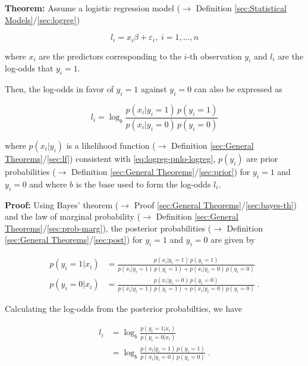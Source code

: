 \documentclass[a4paper,12pt,twoside]{book}
\begin{document}
\textbf{Theorem:} Assume a logistic regression model ($\rightarrow$ Definition \ref{sec:Statistical Models}/\ref{sec:logreg})

\begin{equation} \label{eq:logreg-pnlo-logreg}
l_i = x_i \beta + \varepsilon_i, \; i = 1,\ldots,n
\end{equation}

where $x_i$ are the predictors corresponding to the $i$-th observation $y_i$ and $l_i$ are the log-odds that $y_i = 1$.

Then, the log-odds in favor of $y_i = 1$ against $y_i = 0$ can also be expressed as

\begin{equation} \label{eq:logreg-pnlo-lodds}
l_i = \log_b \frac{p(x_i|y_i=1) \, p(y_i=1)}{p(x_i|y_i=0) \, p(y_i=0)}
\end{equation}

where $p(x_i \vert y_i)$ is a likelihood function ($\rightarrow$ Definition \ref{sec:General Theorems}/\ref{sec:lf}) consistent with \eqref{eq:logreg-pnlo-logreg}, $p(y_i)$ are prior probabilities ($\rightarrow$ Definition \ref{sec:General Theorems}/\ref{sec:prior}) for $y_i = 1$ and $y_i = 0$ and where $b$ is the base used to form the log-odds $l_i$.


\vspace{1em}
\textbf{Proof:} Using Bayes' theorem ($\rightarrow$ Proof \ref{sec:General Theorems}/\ref{sec:bayes-th}) and the law of marginal probability ($\rightarrow$ Definition \ref{sec:General Theorems}/\ref{sec:prob-marg}), the posterior probabilities ($\rightarrow$ Definition \ref{sec:General Theorems}/\ref{sec:post}) for $y_i = 1$ and $y_i = 0$ are given by

\begin{equation} \label{eq:logreg-pnlo-prob}
\begin{split}
p(y_i=1|x_i) &= \frac{p(x_i|y_i=1) \, p(y_i=1)}{p(x_i|y_i=1) \, p(y_i=1) + p(x_i|y_i=0) \, p(y_i=0)} \\
p(y_i=0|x_i) &= \frac{p(x_i|y_i=0) \, p(y_i=0)}{p(x_i|y_i=1) \, p(y_i=1) + p(x_i|y_i=0) \, p(y_i=0)} \; .
\end{split}
\end{equation}

Calculating the log-odds from the posterior probabilties, we have

\begin{equation} \label{eq:logreg-pnlo-lodds-qed}
\begin{split}
l_i &= \log_b \frac{p(y_i=1|x_i)}{p(y_i=0|x_i)} \\
&= \log_b \frac{p(x_i|y_i=1) \, p(y_i=1)}{p(x_i|y_i=0) \, p(y_i=0)} \; .
\end{split}
\end{equation}
\end{document}

